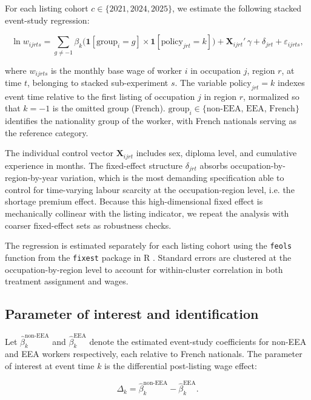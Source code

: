 \documentclass[9pt]{article}
\begin{document}
For each listing cohort $c \in \{2021, 2024, 2025\}$, we estimate the
following stacked event-study regression:

\begin{equation}
  \ln w_{ijrts} =
    \sum_{g \neq -1} \beta_k \bigl(\mathbf{1}[\text{group}_i = g]
      \times \mathbf{1}[\text{policy}_{jrt} = k]\bigr)
    + \mathbf{X}_{ijrt}'\,\gamma
    + \delta_{jrt}
    + \varepsilon_{ijrts},
  \label{eq:eventstudy}
\end{equation}

\noindent
where $w_{ijrts}$ is the monthly base wage of worker $i$ in occupation $j$,
region $r$, at time $t$, belonging to stacked sub-experiment $s$.
The variable $\text{policy}_{jrt} = k$ indexes event time relative to the first
listing of occupation $j$ in region $r$, normalized so that $k = -1$ is the
omitted group (French). $\text{group}_i \in
\{\text{non-EEA},\, \text{EEA},\, \text{French}\}$ identifies the
nationality group of the worker, with French nationals serving as the
reference category.

The individual control vector $\mathbf{X}_{ijrt}$ includes sex, diploma
level, and cumulative experience in months. The fixed-effect structure
$\delta_{jrt}$ absorbs occupation-by-region-by-year variation, which is
the most demanding specification able to control for time-varying labour
scarcity at the occupation-region level, i.e. the shortage premium
effect. Because this high-dimensional fixed
effect is mechanically collinear with the listing indicator, we repeat the
analysis with coarser fixed-effect sets as robustness checks.

The regression is estimated separately for each listing cohort using the
\texttt{feols} function from the \texttt{fixest} package in \textsf{R}
\citep{Berge2018}. Standard errors are clustered at the
occupation-by-region level to account for within-cluster correlation in
both treatment assignment and wages.

\subsection{Parameter of interest and identification}

Let $\hat\beta_k^{\text{non-EEA}}$ and $\hat\beta_k^{\text{EEA}}$ denote
the estimated event-study coefficients for non-EEA and EEA workers
respectively, each relative to French nationals. The parameter of interest
at event time $k$ is the differential post-listing wage effect:

\begin{equation}
  \Delta_k =
  \hat\beta_k^{\text{non-EEA}} - \hat\beta_k^{\text{EEA}}.
  \label{eq:delta}
\end{equation}
\end{document}

